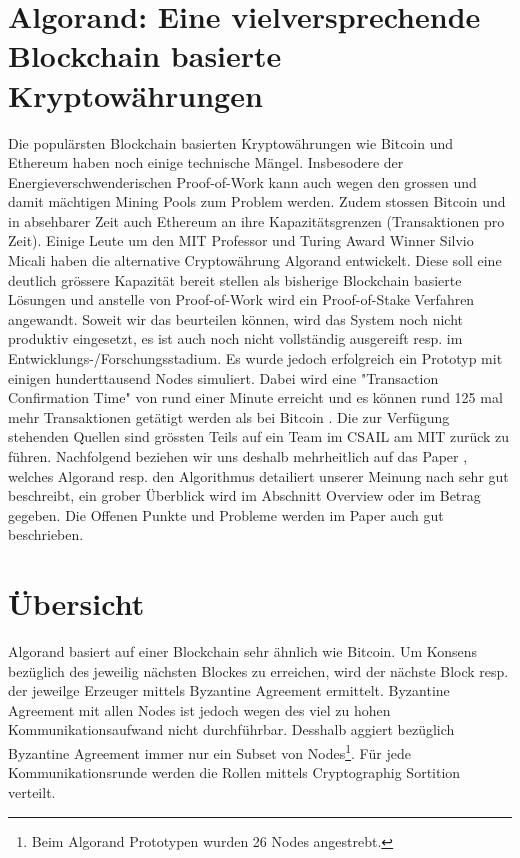 \documentclass[11pt,a4paper]{article}
\author{Heinz Hofmann und Jonas Schmid}
\begin{document}
\section*{ \center \textbf{\LARGE Algorand: Eine vielversprechende Blockchain basierte Kryptow\"ahrungen}}

Die popul\"arsten Blockchain basierten Kryptow\"ahrungen wie Bitcoin und Ethereum haben noch einige technische M\"angel.
Insbesodere der Energieverschwenderischen Proof-of-Work kann auch wegen den grossen 
und damit m\"achtigen Mining Pools zum Problem werden.
Zudem stossen Bitcoin und in absehbarer Zeit auch Ethereum an ihre Kapazit\"atsgrenzen (Transaktionen pro Zeit).
Einige Leute um den MIT Professor und Turing Award Winner Silvio Micali haben die alternative Cryptow\"ahrung Algorand entwickelt.
Diese soll eine deutlich gr\"ossere Kapazit\"at bereit stellen als bisherige Blockchain basierte L\"osungen und anstelle von Proof-of-Work wird ein Proof-of-Stake Verfahren angewandt.
Soweit wir das beurteilen k\"onnen, wird das System noch nicht produktiv eingesetzt,
es ist auch noch nicht vollst\"andig ausgereift resp. im Entwicklungs-/Forschungsstadium.
Es wurde jedoch erfolgreich ein Prototyp mit einigen hunderttausend Nodes simuliert\cite[Kapitel Implementation \& Evaluation]{Gilad:2017:ASB:3132747.3132757}.
Dabei wird eine "Transaction Confirmation Time" von rund einer Minute erreicht und es k\"onnen rund 125 mal mehr Transaktionen get\"atigt werden als bei Bitcoin \cite[Introduction]{Gilad:2017:ASB:3132747.3132757}.
Die zur Verf\"ugung stehenden Quellen sind gr\"ossten Teils auf ein Team im CSAIL am MIT zur\"uck zu f\"uhren. %
Nachfolgend beziehen wir uns deshalb mehrheitlich auf das Paper \cite{Gilad:2017:ASB:3132747.3132757}, 
welches Algorand resp. den Algorithmus detailiert unserer Meinung nach sehr gut beschreibt,
ein grober \"Uberblick wird im Abschnitt Overview oder im Betrag \cite{ScalingConsensus} gegeben.
Die Offenen Punkte und Probleme werden im Paper auch gut beschrieben.

\section*{\"Ubersicht}
Algorand basiert auf einer Blockchain sehr \"ahnlich wie Bitcoin.
Um Konsens bez\"uglich des jeweilig n\"achsten Blockes zu erreichen,
wird der n\"achste Block resp. der jeweilge Erzeuger mittels Byzantine Agreement ermittelt.
Byzantine Agreement mit allen Nodes ist jedoch wegen des viel zu hohen Kommunikationsaufwand nicht durchf\"uhrbar.
Desshalb aggiert bez\"uglich Byzantine Agreement immer nur ein Subset von Nodes\footnote{Beim Algorand Prototypen wurden 26 Nodes angestrebt.}.
F\"ur jede Kommunikationsrunde werden die Rollen mittels Cryptographig Sortition verteilt.
\end{document}
